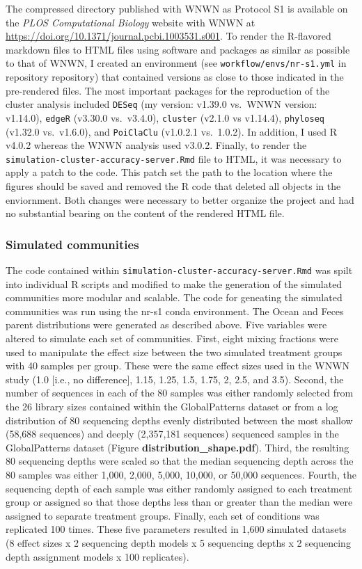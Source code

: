 \documentclass[
]{article}
\begin{document}
The compressed directory published with WNWN as Protocol S1 is available
on the \emph{PLOS Computational Biology} website with WNWN at
\url{https://doi.org/10.1371/journal.pcbi.1003531.s001}. To render the
R-flavored markdown files to HTML files using software and packages as
similar as possible to that of WNWN, I created an environment (see
\texttt{workflow/envs/nr-s1.yml} in repository repository) that
contained versions as close to those indicated in the pre-rendered
files. The most important packages for the reproduction of the cluster
analysis included \texttt{DESeq} (my version: v1.39.0 vs.~WNWN version:
v1.14.0), \texttt{edgeR} (v3.30.0 vs.~v3.4.0), \texttt{cluster} (v2.1.0
vs v1.14.4), \texttt{phyloseq} (v1.32.0 vs.~v1.6.0), and
\texttt{PoiClaClu} (v1.0.2.1 vs.~1.0.2). In addition, I used R v4.0.2
whereas the WNWN analysis used v3.0.2. Finally, to render the
\texttt{simulation-cluster-accuracy-server.Rmd} file to HTML, it was
necessary to apply a patch to the code. This patch set the path to the
location where the figures should be saved and removed the R code that
deleted all objects in the enviornment. Both changes were necessary to
better organize the project and had no substantial bearing on the
content of the rendered HTML file.

\hypertarget{simulated-communities}{%
\subsubsection{Simulated communities}\label{simulated-communities}}

The code contained within
\texttt{simulation-cluster-accuracy-server.Rmd} was spilt into
individual R scripts and modified to make the generation of the
simulated communities more modular and scalable. The code for geneating
the simulated communities was run using the nr-s1 conda environment. The
Ocean and Feces parent distributions were generated as described above.
Five variables were altered to simulate each set of communities. First,
eight mixing fractions were used to manipulate the effect size between
the two simulated treatment groups with 40 samples per group. These were
the same effect sizes used in the WNWN study (1.0 {[}i.e., no
difference{]}, 1.15, 1.25, 1.5, 1.75, 2, 2.5, and 3.5). Second, the
number of sequences in each of the 80 samples was either randomly
selected from the 26 library sizes contained within the GlobalPatterns
dataset or from a log distribution of 80 sequencing depths evenly
distributed between the most shallow (58,688 sequences) and deeply
(2,357,181 sequences) sequenced samples in the GlobalPatterns dataset
(Figure \textbf{distribution\_shape.pdf}). Third, the resulting 80
sequencing depths were scaled so that the median sequencing depth across
the 80 samples was either 1,000, 2,000, 5,000, 10,000, or 50,000
sequences. Fourth, the sequencing depth of each sample was either
randomly assigned to each treatment group or assigned so that those
depths less than or greater than the median were assigned to separate
treatment groups. Finally, each set of conditions was replicated 100
times. These five parameters resulted in 1,600 simulated datasets (8
effect sizes x 2 sequencing depth models x 5 sequencing depths x 2
sequencing depth assignment models x 100 replicates).
\end{document}
